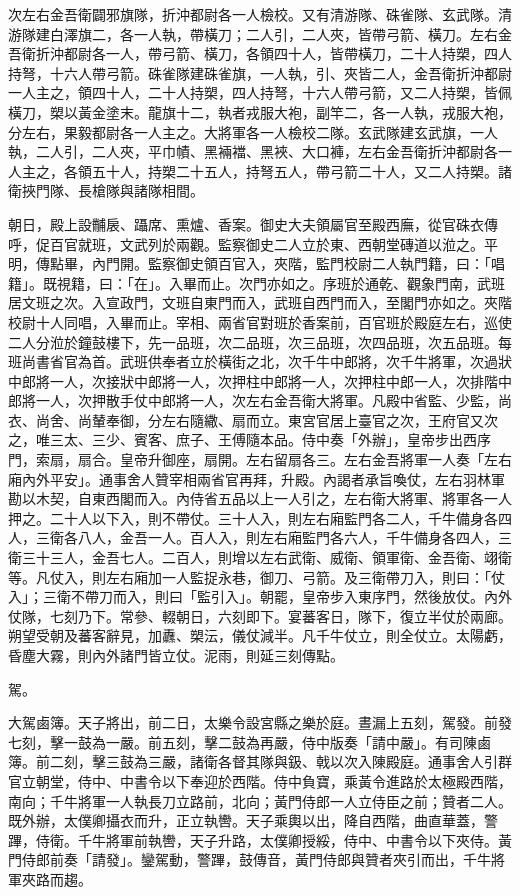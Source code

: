 \begin{pinyinscope}
 次左右金吾衛闢邪旗隊，折沖都尉各一人檢校。又有清游隊、硃雀隊、玄武隊。清游隊建白澤旗二，各一人執，帶橫刀；二人引，二人夾，皆帶弓箭、橫刀。左右金吾衛折沖都尉各一人，帶弓箭、橫刀，各領四十人，皆帶橫刀，二十人持槊，四人持弩，十六人帶弓箭。硃雀隊建硃雀旗，一人執，引、夾皆二人，金吾衛折沖都尉一人主之，領四十人，二十人持槊，四人持弩，十六人帶弓箭，又二人持槊，皆佩橫刀，槊以黃金塗末。龍旗十二，執者戎服大袍，副竿二，各一人執，戎服大袍，分左右，果毅都尉各一人主之。大將軍各一人檢校二隊。玄武隊建玄武旗，一人執，二人引，二人夾，平巾幘、黑裲襠、黑裌、大口褲，左右金吾衛折沖都尉各一人主之，各領五十人，持槊二十五人，持弩五人，帶弓箭二十人，又二人持槊。諸衛挾門隊、長槍隊與諸隊相間。



 朝日，殿上設黼扆、躡席、熏爐、香案。御史大夫領屬官至殿西廡，從官硃衣傳呼，促百官就班，文武列於兩觀。監察御史二人立於東、西朝堂磚道以涖之。平明，傳點畢，內門開。監察御史領百官入，夾階，監門校尉二人執門籍，曰：「唱籍」。既視籍，曰：「在」。入畢而止。次門亦如之。序班於通乾、觀象門南，武班居文班之次。入宣政門，文班自東門而入，武班自西門而入，至閣門亦如之。夾階校尉十人同唱，入畢而止。宰相、兩省官對班於香案前，百官班於殿庭左右，巡使二人分涖於鐘鼓樓下，先一品班，次二品班，次三品班，次四品班，次五品班。每班尚書省官為首。武班供奉者立於橫街之北，次千牛中郎將，次千牛將軍，次過狀中郎將一人，次接狀中郎將一人，次押柱中郎將一人，次押柱中郎一人，次排階中郎將一人，次押散手仗中郎將一人，次左右金吾衛大將軍。凡殿中省監、少監，尚衣、尚舍、尚輦奉御，分左右隨繖、扇而立。東宮官居上臺官之次，王府官又次之，唯三太、三少、賓客、庶子、王傅隨本品。侍中奏「外辦」，皇帝步出西序門，索扇，扇合。皇帝升御座，扇開。左右留扇各三。左右金吾將軍一人奏「左右廂內外平安」。通事舍人贊宰相兩省官再拜，升殿。內謁者承旨喚仗，左右羽林軍勘以木契，自東西閣而入。內侍省五品以上一人引之，左右衛大將軍、將軍各一人押之。二十人以下入，則不帶仗。三十人入，則左右廂監門各二人，千牛備身各四人，三衛各八人，金吾一人。百人入，則左右廂監門各六人，千牛備身各四人，三衛三十三人，金吾七人。二百人，則增以左右武衛、威衛、領軍衛、金吾衛、翊衛等。凡仗入，則左右廂加一人監捉永巷，御刀、弓箭。及三衛帶刀入，則曰：「仗入」；三衛不帶刀而入，則曰「監引入」。朝罷，皇帝步入東序門，然後放仗。內外仗隊，七刻乃下。常參、輟朝日，六刻即下。宴蕃客日，隊下，復立半仗於兩廊。朔望受朝及蕃客辭見，加纛、槊沄，儀仗減半。凡千牛仗立，則全仗立。太陽虧，昏塵大霧，則內外諸門皆立仗。泥雨，則延三刻傳點。



 駕。



 大駕鹵簿。天子將出，前二日，太樂令設宮縣之樂於庭。晝漏上五刻，駕發。前發七刻，擊一鼓為一嚴。前五刻，擊二鼓為再嚴，侍中版奏「請中嚴」。有司陳鹵簿。前二刻，擊三鼓為三嚴，諸衛各督其隊與鈒、戟以次入陳殿庭。通事舍人引群官立朝堂，侍中、中書令以下奉迎於西階。侍中負寶，乘黃令進路於太極殿西階，南向；千牛將軍一人執長刀立路前，北向；黃門侍郎一人立侍臣之前；贊者二人。既外辦，太僕卿攝衣而升，正立執轡。天子乘輿以出，降自西階，曲直華蓋，警蹕，侍衛。千牛將軍前執轡，天子升路，太僕卿授綏，侍中、中書令以下夾侍。黃門侍郎前奏「請發」。鑾駕動，警蹕，鼓傳音，黃門侍郎與贊者夾引而出，千牛將軍夾路而趨。




\end{pinyinscope}
